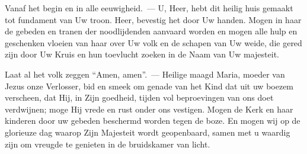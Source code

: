 \documentclass[12pt,twoside,a5paper]{article}
\begin{document}
\begin{halfparskip}
   Vanaf het begin en in alle eeuwigheid.~--- U, Heer, hebt dit heilig huis gemaakt tot fundament van Uw troon. Heer, bevestig het door Uw handen. Mogen in haar de gebeden en tranen der noodlijdenden aanvaard worden en mogen alle hulp en geschenken vloeien van haar over Uw volk en de schapen van Uw weide, die gered zijn door Uw Kruis en hun toevlucht zoeken in de Naam van Uw majesteit.
\end{halfparskip}

\begin{halfparskip}
    Laat al het volk zeggen ``Amen, amen''.~--- Heilige maagd Maria, moeder van Jezus onze Verlosser, bid en smeek om genade van het Kind dat uit uw boezem verscheen, dat Hij, in Zijn goedheid, tijden vol beproevingen van ons doet verdwijnen; moge Hij vrede en rust onder ons vestigen. Mogen de Kerk en haar kinderen door uw gebeden beschermd worden tegen de boze. En mogen wij op de glorieuze dag waarop Zijn Majesteit wordt geopenbaard, samen met u waardig zijn om vreugde te genieten in de bruidskamer van licht.
\end{halfparskip}

\begin{halfparskip}
  \liturgicalOption{}
\end{halfparskip}


\end{document}
